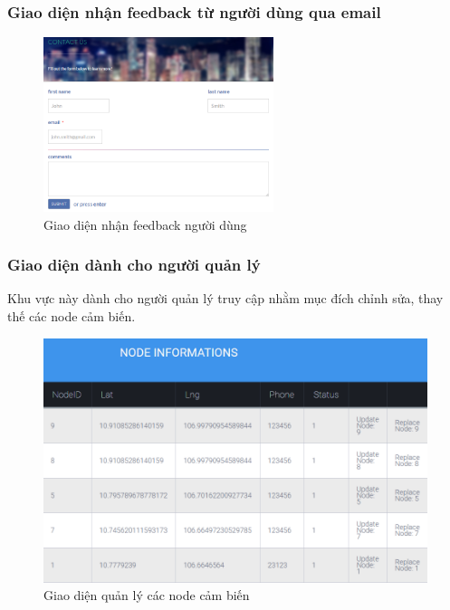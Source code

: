 \subsubsection*{Giao diện nhận feedback từ người dùng qua email}
	\begin{figure}[H]
		\centering    
		\includegraphics[width=0.6\textwidth]{web_email}
		\caption[Giao diện nhận feedback người dùng]{Giao diện nhận feedback người dùng}
		\label{fig:web_email}
	\end{figure}

\subsubsection*{Giao diện dành cho người quản lý}
Khu vực này dành cho người quản lý truy cập nhằm mục đích chỉnh sửa, thay thế các node cảm biến.
	\begin{figure}[H]
		\centering    
		\includegraphics[width=1\textwidth]{web_nodeinfo}
		\caption[Giao diện quản lý các node cảm biến]{Giao diện quản lý các node cảm biến}
		\label{fig:web_nodeinfo}
	\end{figure}
	
\newpage
